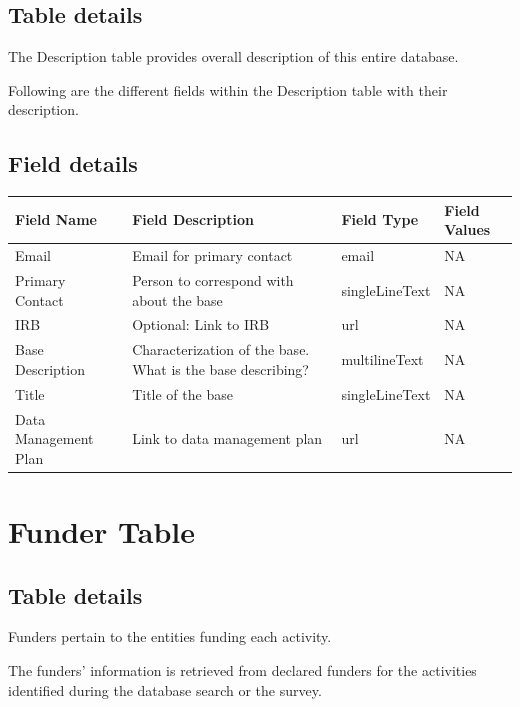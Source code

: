 \documentclass[
]{book}
\begin{document}
\hypertarget{table-details-2}{%
\subsection{Table details}\label{table-details-2}}

The Description table provides overall description of this entire database.

Following are the different fields within the Description table with their description.

\hypertarget{field-details}{%
\subsection{Field details}\label{field-details}}

\begin{table}
\centering
\begin{tabular}{l|l|l|l}
\hline
\textbf{Field Name} & \textbf{Field Description} & \textbf{Field Type} & \textbf{Field Values}\\
\hline
Email & Email for primary contact & email & NA\\
\hline
Primary Contact & Person to correspond with about the base & singleLineText & NA\\
\hline
IRB & Optional: Link to IRB & url & NA\\
\hline
Base Description & Characterization of the base. What is the base describing? & multilineText & NA\\
\hline
Title & Title of the base & singleLineText & NA\\
\hline
Data Management Plan & Link to data management plan & url & NA\\
\hline
\end{tabular}
\end{table}

\hypertarget{funders-table}{%
\section{Funder Table}\label{funders-table}}

\hypertarget{table-details-3}{%
\subsection{Table details}\label{table-details-3}}

Funders pertain to the entities funding each activity.

The funders' information is retrieved from declared funders for the activities identified during the database search or the survey.
\end{document}
